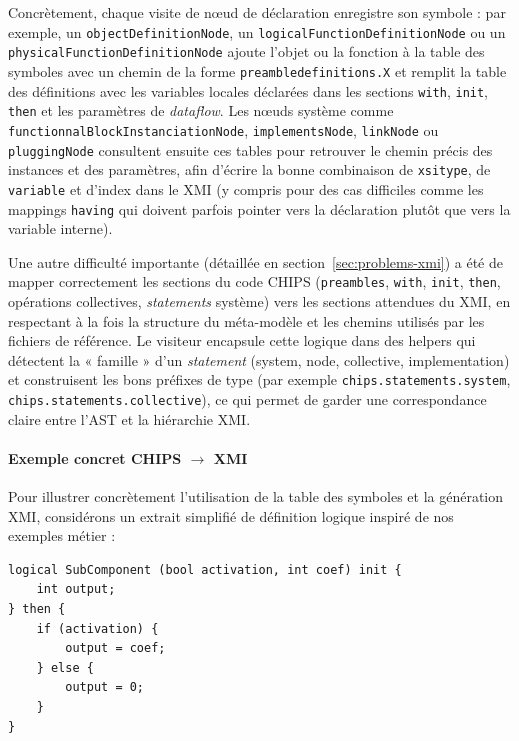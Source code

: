\documentclass[a4paper, 11pt]{article}
\newcommand{\prog}[1]{\texttt{#1}}
\begin{document}
Concrètement, chaque visite de nœud de déclaration enregistre son symbole : par exemple, un \prog{objectDefinitionNode}, un \prog{logicalFunctionDefinitionNode} ou un \newline \prog{physicalFunctionDefinitionNode} ajoute l’objet ou la fonction à la table des symboles avec un chemin de la forme \prog{preambledefinitions.X} et remplit la table des définitions avec les variables locales déclarées dans les sections \prog{with}, \prog{init}, \prog{then} et les paramètres de \emph{dataflow}. Les nœuds système comme \prog{functionnalBlockInstanciationNode}, \prog{implementsNode}, \prog{linkNode} ou \prog{pluggingNode} consultent ensuite ces tables pour retrouver le chemin précis des instances et des paramètres, afin d’écrire la bonne combinaison de \prog{xsitype}, de \prog{variable} et d’index dans le XMI (y compris pour des cas difficiles comme les mappings \prog{having} qui doivent parfois pointer vers la déclaration plutôt que vers la variable interne).

Une autre difficulté importante (détaillée en section~\ref{sec:problems-xmi}) a été de mapper correctement les sections du code CHIPS (\prog{preambles}, \prog{with}, \prog{init}, \prog{then}, opérations collectives, \emph{statements} système) vers les sections attendues du XMI, en respectant à la fois la structure du méta-modèle et les chemins utilisés par les fichiers de référence. Le visiteur encapsule cette logique dans des helpers qui détectent la « famille » d’un \emph{statement} (system, node, collective, implementation) et construisent les bons préfixes de type (par exemple \prog{chips.statements.system}, \newline \prog{chips.statements.collective}), ce qui permet de garder une correspondance claire entre l’AST et la hiérarchie XMI.

\paragraph{Exemple concret CHIPS \texorpdfstring{$\rightarrow$}{->} XMI}

Pour illustrer concrètement l’utilisation de la table des symboles et la génération XMI, considérons un extrait simplifié de définition logique inspiré de nos exemples métier :

\begin{lstlisting}[language=Chips, caption={Exemple de fonction logique avec paramètre de dataflow}, label={lst:logical-example}]
logical SubComponent (bool activation, int coef) init {
    int output;
} then {
    if (activation) {
        output = coef;
    } else {
        output = 0;
    }  
} 
\end{lstlisting}
\end{document}
